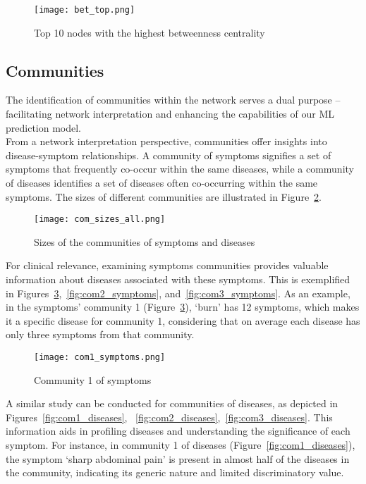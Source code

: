 \begin{figure}[H]
    \centering
    \texttt{[image: bet\_top.png]}
    \caption{Top 10 nodes with the highest betweenness centrality}\label{fig:bet_top}
\end{figure}
\noindent

\subsection{Communities}

The identification of communities within the network serves a dual purpose – facilitating network interpretation
and enhancing the capabilities of our ML prediction model.\\
From a network interpretation perspective, communities offer insights into disease-symptom relationships.
A community of symptoms signifies a set of symptoms that frequently co-occur within the same diseases, while a
community of diseases identifies a set of diseases often co-occurring within the same symptoms. The sizes of
different communities are illustrated in Figure~\ref{fig:com_sizes_all}.

\begin{figure}[H]
    \centering
    \texttt{[image: com\_sizes\_all.png]}
    \caption{Sizes of the communities of symptoms and diseases}\label{fig:com_sizes_all}
\end{figure}

\noindent
For clinical relevance, examining symptoms communities provides valuable information about diseases associated
with these symptoms. This is exemplified in Figures~\ref{fig:com1_symptoms},~\ref{fig:com2_symptoms},
and~\ref{fig:com3_symptoms}. As an example, in the symptoms' community 1 (Figure~\ref{fig:com1_symptoms}),
`burn' has 12 symptoms, which makes it a specific disease for community 1,
considering that on average each disease has only three symptoms from that community.

\begin{figure}[H]
    \centering
    \texttt{[image: com1\_symptoms.png]}
    \caption{Community 1 of symptoms}\label{fig:com1_symptoms}
\end{figure}

\noindent
A similar study can be conducted for communities of diseases, as depicted in Figures~\ref{fig:com1_diseases},
~\ref{fig:com2_diseases},~\ref{fig:com3_diseases}. This information aids in profiling diseases and understanding
the significance of each symptom. For instance, in community 1 of diseases (Figure~\ref{fig:com1_diseases}),
the symptom `sharp abdominal pain' is present in almost half of the diseases in the community, indicating its
generic nature and limited discriminatory value.

